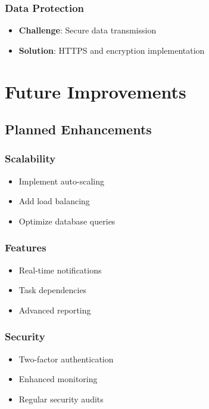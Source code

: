 \documentclass[12pt,a4paper]{article}
\begin{document}
\subsubsection{Data Protection}
\begin{itemize}
    \item \textbf{Challenge}: Secure data transmission
    \item \textbf{Solution}: HTTPS and encryption implementation
\end{itemize}

\section{Future Improvements}

\subsection{Planned Enhancements}

\subsubsection{Scalability}
\begin{itemize}
    \item Implement auto-scaling
    \item Add load balancing
    \item Optimize database queries
\end{itemize}

\subsubsection{Features}
\begin{itemize}
    \item Real-time notifications
    \item Task dependencies
    \item Advanced reporting
\end{itemize}

\subsubsection{Security}
\begin{itemize}
    \item Two-factor authentication
    \item Enhanced monitoring
    \item Regular security audits
\end{itemize}
\end{document}
